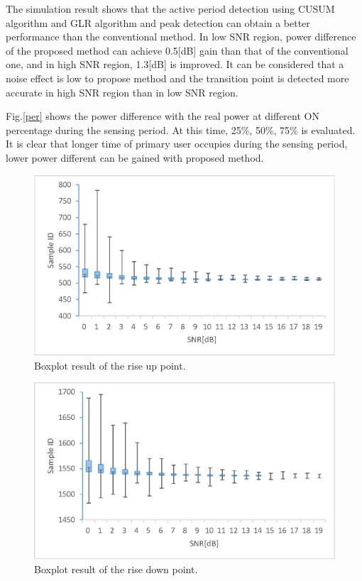 The simulation result shows that the active period detection using CUSUM algorithm and GLR algorithm and peak detection can obtain a better performance than the conventional method. In low SNR region, power difference of the proposed method can achieve 0.5[dB] gain than that of the conventional one, and in high SNR region, 1.3[dB] is improved. It can be considered that a noise effect is low to propose method and the transition point is detected more accurate in high SNR region than in low SNR region.

Fig.\ref{per} shows the power difference with the real power at different ON percentage during the sensing period. At this time, 25\%, 50\%, 75\% is evaluated. It is clear that longer time of primary user occupies during the sensing period, lower power different can be gained with proposed method.  

\begin{figure}[!htp]
\centering
\includegraphics[width=120mm]{transition_up.eps}
\caption{Boxplot result of the rise up point.}
\label{transition_up}
\end{figure}
\begin{figure}[!htp]
\centering
\includegraphics[width=120mm]{transition_down.eps}
\caption{Boxplot result of the rise down point.}
\label{transition_down}
\end{figure}

